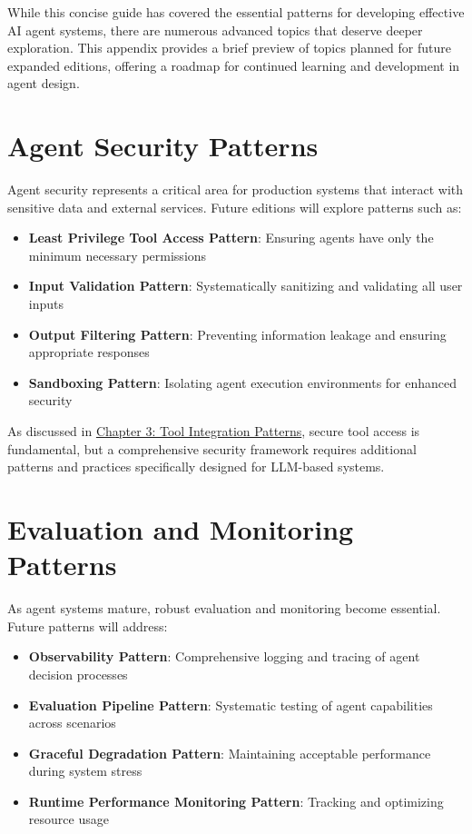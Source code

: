 \documentclass[11pt,oneside]{book}
\providecommand{\tightlist}{%
  \setlength{\itemsep}{0pt}\setlength{\parskip}{0pt}}
\begin{document}
While this concise guide has covered the essential patterns for
developing effective AI agent systems, there are numerous advanced
topics that deserve deeper exploration. This appendix provides a brief
preview of topics planned for future expanded editions, offering a
roadmap for continued learning and development in agent design.

\section{Agent Security Patterns}\label{agent-security-patterns}

Agent security represents a critical area for production systems that
interact with sensitive data and external services. Future editions will
explore patterns such as:

\begin{itemize}
\tightlist
\item
  \textbf{Least Privilege Tool Access Pattern}: Ensuring agents have
  only the minimum necessary permissions
\item
  \textbf{Input Validation Pattern}: Systematically sanitizing and
  validating all user inputs
\item
  \textbf{Output Filtering Pattern}: Preventing information leakage and
  ensuring appropriate responses
\item
  \textbf{Sandboxing Pattern}: Isolating agent execution environments
  for enhanced security
\end{itemize}

As discussed in \href{03_tool_integration_patterns.md}{Chapter 3: Tool
Integration Patterns}, secure tool access is fundamental, but a
comprehensive security framework requires additional patterns and
practices specifically designed for LLM-based systems.

\section{Evaluation and Monitoring
Patterns}\label{evaluation-and-monitoring-patterns}

As agent systems mature, robust evaluation and monitoring become
essential. Future patterns will address:

\begin{itemize}
\tightlist
\item
  \textbf{Observability Pattern}: Comprehensive logging and tracing of
  agent decision processes
\item
  \textbf{Evaluation Pipeline Pattern}: Systematic testing of agent
  capabilities across scenarios
\item
  \textbf{Graceful Degradation Pattern}: Maintaining acceptable
  performance during system stress
\item
  \textbf{Runtime Performance Monitoring Pattern}: Tracking and
  optimizing resource usage
\end{itemize}
\end{document}
